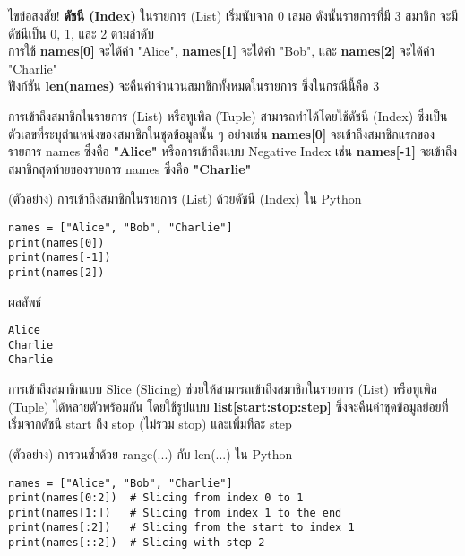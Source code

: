 \documentclass[12pt,a4paper]{article}
\newcommand{\textlight}[1]{{\thailightfont #1}}
\begin{document}
\begin{answerbox}{ไขข้อสงสัย!}
\textlight{\textbf{ดัชนี (Index)} ในรายการ (List) เริ่มนับจาก 0 เสมอ ดังนั้นรายการที่มี 3 สมาชิก จะมีดัชนีเป็น 0, 1, และ 2 ตามลำดับ \\[0.3cm] การใช้ \textbf{names[0]} จะได้ค่า "Alice", \textbf{names[1]} จะได้ค่า "Bob", และ \textbf{names[2]} จะได้ค่า "Charlie" \\[0.3cm] ฟังก์ชัน \textbf{len(names)} จะคืนค่าจำนวนสมาชิกทั้งหมดในรายการ ซึ่งในกรณีนี้คือ 3}
\end{answerbox}

\vspace{3cm}

\textlight{การเข้าถึงสมาชิกในรายการ (List) หรือทูเพิล (Tuple) สามารถทำได้โดยใช้ดัชนี (Index) ซึ่งเป็นตัวเลขที่ระบุตำแหน่งของสมาชิกในชุดข้อมูลนั้น ๆ อย่างเช่น \textbf{names[0]} จะเข้าถึงสมาชิกแรกของรายการ names ซึ่งคือ \textbf{"Alice"} หรือการเข้าถึงแบบ Negative Index เช่น \textbf{names[-1]} จะเข้าถึงสมาชิกสุดท้ายของรายการ names ซึ่งคือ \textbf{"Charlie"}}

\begin{codebox}{(ตัวอย่าง) การเข้าถึงสมาชิกในรายการ (List) ด้วยดัชนี (Index) ใน Python}
\begin{lstlisting}[style=python]
names = ["Alice", "Bob", "Charlie"]
print(names[0])
print(names[-1])
print(names[2])
\end{lstlisting}
\end{codebox}

\begin{resultbox}{ผลลัพธ์}
\begin{verbatim}
Alice
Charlie
Charlie
\end{verbatim}
\end{resultbox}

\vspace{0.5cm}

\textlight{การเข้าถึงสมาชิกแบบ Slice (Slicing) ช่วยให้สามารถเข้าถึงสมาชิกในรายการ (List) หรือทูเพิล (Tuple) ได้หลายตัวพร้อมกัน โดยใช้รูปแบบ \textbf{list[start:stop:step]} ซึ่งจะคืนค่าชุดข้อมูลย่อยที่เริ่มจากดัชนี start ถึง stop (ไม่รวม stop) และเพิ่มทีละ step}

\begin{codebox}{(ตัวอย่าง) การวนซ้ำด้วย range(...) กับ len(...) ใน Python}
\begin{lstlisting}[style=python]
names = ["Alice", "Bob", "Charlie"]
print(names[0:2])  # Slicing from index 0 to 1
print(names[1:])   # Slicing from index 1 to the end
print(names[:2])   # Slicing from the start to index 1
print(names[::2])  # Slicing with step 2
\end{lstlisting}
\end{codebox}
\end{document}
